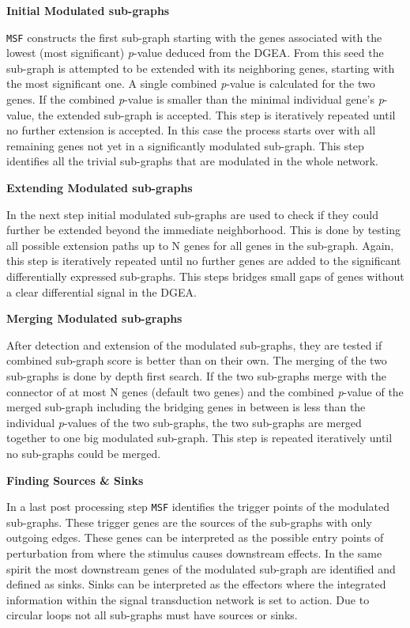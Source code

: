 \documentclass[10pt,a4paper,twocolumn]{article}
\begin{document}
\textbf{Initial Modulated sub-graphs}

\texttt{MSF} constructs the first sub-graph starting with the genes
associated with the lowest (most significant) \textit{p}-value deduced from
the DGEA. From this seed the sub-graph is attempted to be extended with its
neighboring genes, starting with the most significant one. A single combined
\textit{p}-value is calculated for
the two genes. If the combined \textit{p}-value is smaller than the
minimal individual gene's \textit{p}-value, the extended sub-graph is
accepted. This step is iteratively repeated until no
further extension is accepted. In this case the process starts over
with all remaining genes not yet in a significantly modulated
sub-graph. This step identifies all the trivial sub-graphs that are
modulated in the whole network.\newline

\textbf{Extending Modulated sub-graphs}

In the next step initial modulated sub-graphs are used to check if
they could further be extended beyond the immediate neighborhood. This is done by testing all possible extension paths up to N genes
for all genes in the sub-graph. Again, this step is iteratively
repeated until no further genes are added to the significant
differentially expressed sub-graphs. This steps bridges small gaps of
genes without a clear differential signal in the
DGEA.\newline

\textbf{Merging Modulated sub-graphs}

After detection and extension of the modulated sub-graphs, they are
tested if combined sub-graph score is better than on their own. The
merging of the two sub-graphs is done by depth first search. If the
two sub-graphs merge with the connector of at most N genes (default
two genes) and the combined \textit{p}-value of the merged sub-graph
including the bridging genes in between is less than the individual
\textit{p}-values of the two sub-graphs, the two sub-graphs are merged
together to one big modulated sub-graph. This step is
repeated iteratively until no sub-graphs could be merged.\newline

\textbf{Finding Sources \& Sinks}

In a last post processing step \texttt{MSF} identifies the trigger
points of the modulated sub-graphs. These trigger genes are the
sources of the sub-graphs with only outgoing edges. These genes can be
interpreted as the possible entry points of perturbation from where
the stimulus causes downstream effects. In the same spirit the most
downstream genes of the modulated sub-graph are identified and defined
as sinks. Sinks can be interpreted as the effectors where the
integrated information within the signal transduction network is set
to action. Due to circular loops not all sub-graphs must have sources or
sinks.
\end{document}
